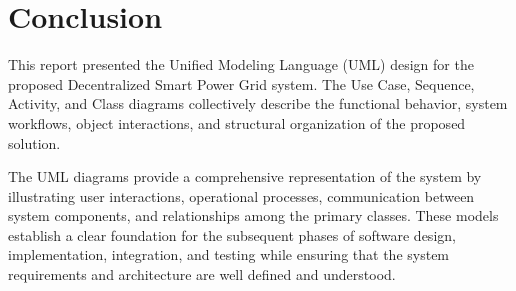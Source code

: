 \section{Conclusion}

This report presented the Unified Modeling Language (UML) design for the
proposed Decentralized Smart Power Grid system. The Use Case, Sequence,
Activity, and Class diagrams collectively describe the functional
behavior, system workflows, object interactions, and structural
organization of the proposed solution.

The UML diagrams provide a comprehensive representation of the system by
illustrating user interactions, operational processes, communication
between system components, and relationships among the primary classes.
These models establish a clear foundation for the subsequent phases of
software design, implementation, integration, and testing while ensuring
that the system requirements and architecture are well defined and
understood.